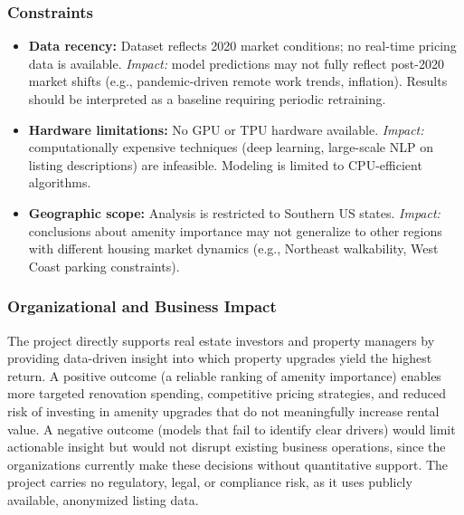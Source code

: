 \subsubsection*{Constraints}
\vspace{-9pt}
\begin{itemize}[itemsep=-9pt]
    \item \textbf{Data recency:} Dataset reflects 2020 market conditions; no real-time pricing data is available. \textit{Impact:} model predictions may not fully reflect post-2020 market shifts (e.g., pandemic-driven remote work trends, inflation). Results should be interpreted as a baseline requiring periodic retraining.
    \item \textbf{Hardware limitations:} No GPU or TPU hardware available. \textit{Impact:} computationally expensive techniques (deep learning, large-scale NLP on listing descriptions) are infeasible. Modeling is limited to CPU-efficient algorithms.
    \item \textbf{Geographic scope:} Analysis is restricted to Southern US states. \textit{Impact:} conclusions about amenity importance may not generalize to other regions with different housing market dynamics (e.g., Northeast walkability, West Coast parking constraints).
\end{itemize}

\medskip\noindent
\subsubsection*{Organizational and Business Impact}
\noindent
The project directly supports real estate investors and property managers by providing data-driven insight into which property upgrades yield the highest return. A positive outcome (a reliable ranking of amenity importance) enables more targeted renovation spending, competitive pricing strategies, and reduced risk of investing in amenity upgrades that do not meaningfully increase rental value. A negative outcome (models that fail to identify clear drivers) would limit actionable insight but would not disrupt existing business operations, since the organizations currently make these decisions without quantitative support. The project carries no regulatory, legal, or compliance risk, as it uses publicly available, anonymized listing data.

